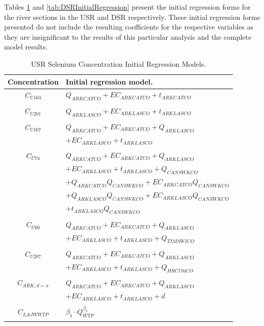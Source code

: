 \begin{linenumbers}

Tables \ref{tab:USRInitialRegression} and \ref{tab:DSRInitialRegression} present the initial regression forms for the river sections in the USR and DSR respectively. These initial regression forms presented do not include the resulting coefficients for the respective variables as they are insignificant to the results of this particular analysis and the complete model results. 

\begin{table}[htbp]
\centering
\caption{USR Selenium Concentration Initial Regression Models.}
\label{tab:USRInitialRegression}
\begin{tabular}{c l}
	\toprule
	Concentration		& Initial regression model.\\
	\toprule
	$ C_{U163} $	& $Q_{ARKCATCO} + EC_{ARKCATCO} + t_{ARKCATCO}$\\
	\\
	$ C_{U201} $	& $Q_{ARKLASCO} + EC_{ARKLASCO} + t_{ARKLASCO}$\\
	\\	
	$ C_{U167} $ & $Q_{ARKCATCO} + EC_{ARKCATCO} + Q_{ARKLASCO}$\\
					& $+ EC_{ARKLASCO} + t_{ARKLASCO}$\\
	\\	
	$ C_{U74} $		& $Q_{ARKCATCO} + EC_{ARKCATCO} + Q_{ARKLASCO}$\\ 
					& $+ EC_{ARKLASCO} + t_{ARKLASCO} + Q_{CANSWKCO}$\\
					& $+ Q_{ARKCATCO}Q_{CANSWKCO} + EC_{ARKCATCO}Q_{CANSWKCO}$\\
					& $+ Q_{ARKLASCO}Q_{CANSWKCO} + EC_{ARKLASCO}Q_{CANSWKCO}$\\
					& $+ t_{ARKLASCO}Q_{CANSWKCO}$\\
	\\
	$ C_{U60} $	& $Q_{ARKCATCO} + EC_{ARKCATCO} + Q_{ARKLASCO}$\\
					& $+ EC_{ARKLASCO} + t_{ARKLASCO} + Q_{TIMSWICO}$\\
	\\
	$ C_{U207} $& $Q_{ARKCATCO} + EC_{ARKCATCO} + Q_{ARKLASCO}$\\
					& $+ EC_{ARKLASCO} + t_{ARKLASCO} + Q_{HRC194CO}$\\
	\\	
	$ C_{ARK,d=x} $	& $Q_{ARKCATCO} + EC_{ARKCATCO} + Q_{ARKLASCO}$\\
					& $+ EC_{ARKLASCO} + t_{ARKLASCO} + d$\\
	\\	
	$ C_{LAJWWTP} $	& $\beta_{1} \cdot Q_{WTP}^{\beta_{2}}$\\
	\bottomrule \\
\end{tabular}
\end{table}


\end{linenumbers}
